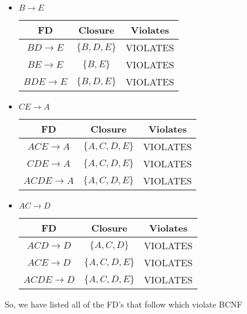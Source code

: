 \documentclass[12pt,letterpaper]{article}
\begin{document}
\begin{enumerate}
\begin{enumerate}
          \begin{itemize}
            \item $B \rightarrow E$

              \begin{tabular}{c | c | c |}
                FD                    & Closure             & Violates \\
                \hline
                $BD \rightarrow E$    & $\{B, D, E\}$       & VIOLATES \\
                \hline
                $BE \rightarrow E$    & $\{B, E\}$          & VIOLATES \\
                \hline
                $BDE \rightarrow E$   & $\{B, D, E\}$       & VIOLATES \\
                \hline
              \end{tabular}

            \item $CE \rightarrow A$

              \begin{tabular}{c | c | c |}
                FD                    & Closure             & Violates \\
                \hline
                $ACE \rightarrow A$   & $\{A, C, D, E\}$    & VIOLATES \\
                \hline
                $CDE \rightarrow A$   & $\{A, C, D, E\}$    & VIOLATES \\
                \hline
                $ACDE \rightarrow A$  & $\{A, C, D, E\}$    & VIOLATES \\
                \hline
              \end{tabular}

            \item $AC \rightarrow D$

              \begin{tabular}{c | c | c |}
                FD                    & Closure             & Violates \\
                \hline
                $ACD \rightarrow D$   & $\{A, C, D\}$       & VIOLATES \\
                \hline
                $ACE \rightarrow D$   & $\{A, C, D, E\}$    & VIOLATES \\
                \hline
                $ACDE \rightarrow D$  & $\{A, C, D, E\}$    & VIOLATES \\
                \hline
              \end{tabular}
          \end{itemize}

        So, we have listed all of the FD's that follow which violate BCNF
      \end{enumerate}
  \end{enumerate}
\end{document}
